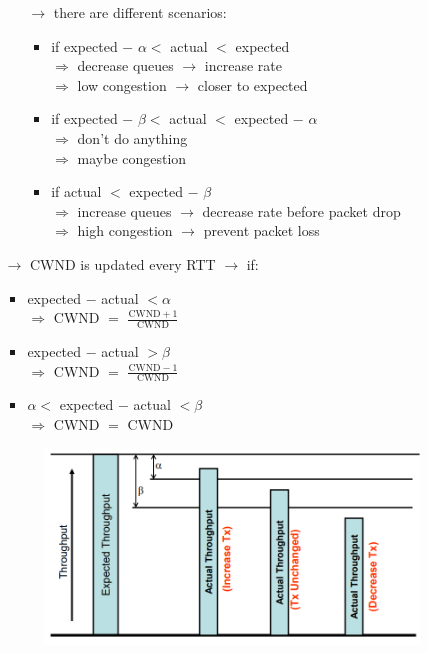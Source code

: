 \begin{itemize}
\begin{itemize}
\begin{itemize}
                $\rightarrow$ there are different scenarios:
            \begin{itemize}
                \item if expected $-$ $\alpha <$ actual $<$ expected\\
                $\Rightarrow$ decrease queues $\rightarrow$ increase rate\\
                $\Rightarrow$ low congestion $\rightarrow$ closer to expected
                \item if expected $-$ $\beta <$ actual $<$ expected $-$ $\alpha$\\
                $\Rightarrow$ don't do anything\\
                $\Rightarrow$ maybe congestion
                \item if actual $<$ expected $-$ $\beta$\\
                $\Rightarrow$ increase queues $\rightarrow$ decrease rate before packet drop\\
                $\Rightarrow$ high congestion $\rightarrow$ prevent packet loss
            \end{itemize}
        \end{itemize}
        \item[$\rightarrow$] CWND is updated every RTT $\rightarrow$ if:
        \begin{itemize}
            \item expected $-$ actual $< \alpha$\\
            $\Rightarrow$ CWND $=$ $\frac{\text{CWND} + 1}{\text{CWND}}$
            \item expected $-$ actual $> \beta$\\
            $\Rightarrow$ CWND $=$ $\frac{\text{CWND} - 1}{\text{CWND}}$
            \item $\alpha <$ expected $-$ actual $< \beta$\\
            $\Rightarrow$ CWND $=$ CWND
        \end{itemize}
        \begin{figure}[!h] 
            \centering 
            \includegraphics[scale = 0.35]{images/congestion-avoidance-vegas.png} 

\end{figure}
\end{itemize}
\end{itemize}
